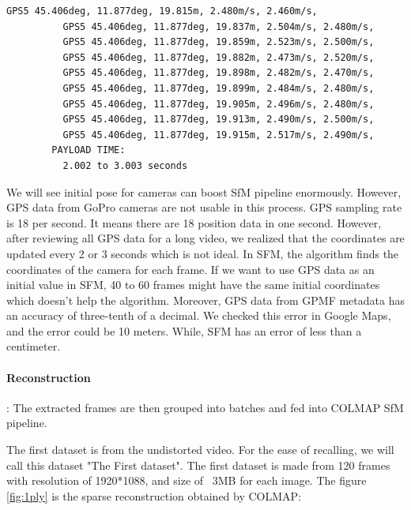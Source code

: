 \documentclass[11pt]{article}
\begin{document}
\begin{lstlisting}[language=bash,caption={gpmf-parser output},label={lst:lstlisting}]
          GPS5 45.406deg, 11.877deg, 19.815m, 2.480m/s, 2.460m/s,
          GPS5 45.406deg, 11.877deg, 19.837m, 2.504m/s, 2.480m/s,
          GPS5 45.406deg, 11.877deg, 19.859m, 2.523m/s, 2.500m/s,
          GPS5 45.406deg, 11.877deg, 19.882m, 2.473m/s, 2.520m/s,
          GPS5 45.406deg, 11.877deg, 19.898m, 2.482m/s, 2.470m/s,
          GPS5 45.406deg, 11.877deg, 19.899m, 2.484m/s, 2.480m/s,
          GPS5 45.406deg, 11.877deg, 19.905m, 2.496m/s, 2.480m/s,
          GPS5 45.406deg, 11.877deg, 19.913m, 2.490m/s, 2.500m/s,
          GPS5 45.406deg, 11.877deg, 19.915m, 2.517m/s, 2.490m/s,
        PAYLOAD TIME:
          2.002 to 3.003 seconds
    \end{lstlisting}

    We will see initial pose for cameras can boost SfM pipeline enormously. However, GPS data from GoPro cameras
    are not usable in this process.
    GPS sampling rate is 18 per second. It means there are 18 position data in one second. However, after reviewing
    all GPS data for a long video, we realized that the coordinates are updated every 2 or 3 seconds which is not ideal.
    In SFM, the algorithm finds the coordinates of the camera for each frame. If we want to use GPS data as an initial
    value in SFM, 40 to 60 frames might have the same initial coordinates which doesn't help the algorithm.
    Moreover, GPS data from GPMF metadata has an accuracy of three-tenth of a decimal. We checked this error in
    Google Maps, and the error could be 10 meters. While, SFM has an error of less than a centimeter.

    \paragraph{Reconstruction}: The extracted frames are then grouped into batches and fed into COLMAP SfM pipeline.

    The first dataset is from the undistorted video. For the ease of recalling, we will call this dataset
    "The First dataset". The first dataset is made from 120 frames with resolution of 1920*1088, and size of ~3MB
    for each image. The figure \ref{fig:1ply} is the sparse reconstruction obtained by COLMAP:
\end{document}

